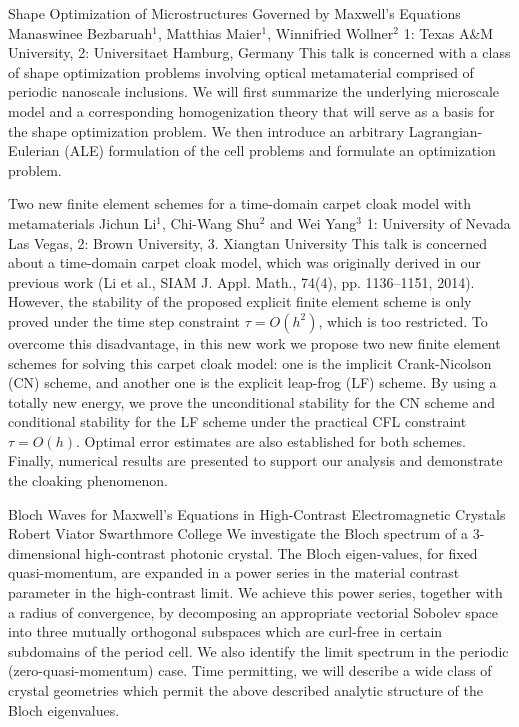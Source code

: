 \vspace{1.5ex}
\abs
{Shape Optimization of Microstructures Governed by Maxwell's Equations}
{Manaswinee Bezbaruah$^{1}$, Matthias Maier$^{1}$, Winnifried Wollner$^{2}$}
{1: Texas A\&M University, 2: Universitaet Hamburg, Germany}
{This talk is concerned with a class of shape optimization problems involving optical metamaterial comprised of periodic nanoscale inclusions. We will first summarize the underlying microscale model and a corresponding homogenization theory that will serve as a basis for the shape optimization problem. We then introduce an arbitrary Lagrangian-Eulerian (ALE) formulation of the cell problems and formulate an optimization problem.}


\vspace{1.5ex}
\abs
{Two new finite element schemes for a time-domain carpet cloak model with metamaterials}
{Jichun Li$^{1}$, Chi-Wang Shu$^{2}$ and Wei Yang$^{3}$}
{1: University of Nevada Las Vegas, 2: Brown University, 3. Xiangtan University}
{This talk is concerned about a time-domain carpet cloak model, which was originally derived in our previous work (Li et al., SIAM J. Appl. Math., 74(4), pp. 1136–1151, 2014). However, the stability of the proposed explicit finite element scheme is only proved under the time step constraint $\tau = O(h^2)$, which is too restricted.  To overcome this disadvantage, in this new work we propose two new finite element schemes for solving this carpet cloak model: one is the implicit Crank-Nicolson (CN) scheme, and another one is the explicit leap-frog (LF) scheme. By using a totally new energy, we prove the unconditional stability for the CN scheme and  conditional stability for the LF scheme under the practical CFL constraint $\tau = O(h)$.   Optimal error estimates are also established for both schemes. Finally, numerical results  are presented to support our analysis and demonstrate the cloaking phenomenon.}


\vspace{1.5ex}
\abs
{Bloch Waves for Maxwell's Equations in High-Contrast Electromagnetic Crystals}
{Robert Viator}
{Swarthmore College}
{We investigate the Bloch spectrum of a 3-dimensional high-contrast photonic crystal. The Bloch eigen-values, for fixed quasi-momentum, are expanded in a power series in the material contrast parameter in the high-contrast limit. We achieve this power series, together with a radius of convergence, by decomposing an appropriate vectorial Sobolev space into three mutually orthogonal subspaces which are curl-free in certain subdomains of the period cell. We also identify the limit spectrum in the periodic (zero-quasi-momentum) case. Time permitting, we will describe a wide class of crystal geometries which permit the above described analytic structure of the Bloch eigenvalues.}



